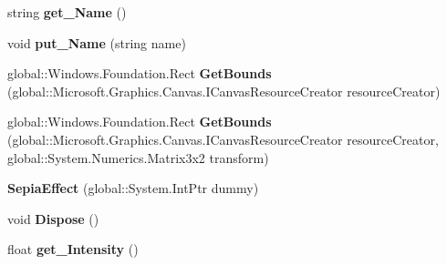 \begin{DoxyCompactItemize}
\item 
\mbox{\label{class_microsoft_1_1_graphics_1_1_canvas_1_1_effects_1_1_sepia_effect_afee6799351e6092b77d4ec5db2f9362d}} 
string {\bfseries get\+\_\+\+Name} ()
\item 
\mbox{\label{class_microsoft_1_1_graphics_1_1_canvas_1_1_effects_1_1_sepia_effect_aada16984eae7d02db5a9f3c837166f22}} 
void {\bfseries put\+\_\+\+Name} (string name)
\item 
\mbox{\label{class_microsoft_1_1_graphics_1_1_canvas_1_1_effects_1_1_sepia_effect_add8f6369add3dc63f033fece446695bb}} 
global\+::\+Windows.\+Foundation.\+Rect {\bfseries Get\+Bounds} (global\+::\+Microsoft.\+Graphics.\+Canvas.\+I\+Canvas\+Resource\+Creator resource\+Creator)
\item 
\mbox{\label{class_microsoft_1_1_graphics_1_1_canvas_1_1_effects_1_1_sepia_effect_a383c90027b969cb3a3d212a103518d83}} 
global\+::\+Windows.\+Foundation.\+Rect {\bfseries Get\+Bounds} (global\+::\+Microsoft.\+Graphics.\+Canvas.\+I\+Canvas\+Resource\+Creator resource\+Creator, global\+::\+System.\+Numerics.\+Matrix3x2 transform)
\item 
\mbox{\label{class_microsoft_1_1_graphics_1_1_canvas_1_1_effects_1_1_sepia_effect_a4f03d37d7ecbcbf4f61d46c7966819d0}} 
{\bfseries Sepia\+Effect} (global\+::\+System.\+Int\+Ptr dummy)
\item 
\mbox{\label{class_microsoft_1_1_graphics_1_1_canvas_1_1_effects_1_1_sepia_effect_a3195a9cdd413f190255cdcda3170755b}} 
void {\bfseries Dispose} ()
\item 
\mbox{\label{class_microsoft_1_1_graphics_1_1_canvas_1_1_effects_1_1_sepia_effect_aa2ff226eed0accddfe57da8d29180372}} 
float {\bfseries get\+\_\+\+Intensity} ()
\item 

\end{DoxyCompactItemize}
